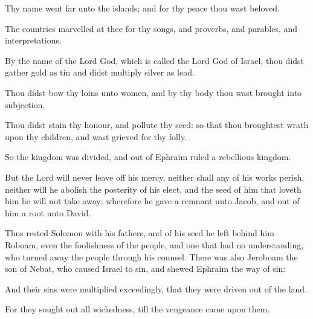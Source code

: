 {\par }{\PP {}Thy name went far unto the islands; and for thy peace thou wast beloved.
\par }{\PP {}The countries marvelled at thee for thy songs, and proverbs, and parables, and interpretations.
\par }{\PP {}By the name of the Lord God, which is called the Lord God of Israel, thou didst gather gold as tin and didst multiply silver as lead.
\par }{\PP {}Thou didst bow thy loins unto women, and by thy body thou wast brought into subjection.
\par }{\PP {}Thou didst stain thy honour, and pollute thy seed: so that thou broughtest wrath upon thy children, and wast grieved for thy folly.
\par }{\PP {}So the kingdom was divided, and out of Ephraim ruled a rebellious kingdom.
\par }{\PP {}But the Lord will never leave off his mercy, neither shall any of his works perish, neither will he abolish the posterity of his elect, and the seed of him that loveth him he will not take away: wherefore he gave a remnant unto Jacob, and out of him a root unto David.
\par }{\PP {}Thus rested Solomon with his fathers, and of his seed he left behind him Roboam, even the foolishness of the people, and one that had no understanding, who turned away the people through his counsel. There was also Jeroboam the son of Nebat, who caused Israel to sin, and shewed Ephraim the way of sin:
\par }{\PP {}And their sins were multiplied exceedingly, that they were driven out of the land.
\par }{\PP {}For they sought out all wickedness, till the vengeance came upon them.

}
